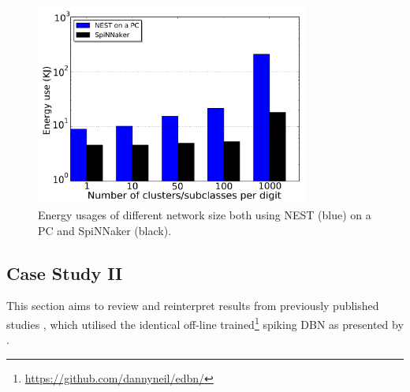 \begin{table}[h]
\begin{center}
\begin{tabular} {l| c  c c c c c}
		\end{tabular}
		\egroup
		\label{tbl:compare}
	\end{center}
\end{table}

\begin{figure}[hbt!]
	\centering
	\includegraphics[width=0.8\textwidth]{pics_bench/fig8}
	\caption{Energy usages of different network size both using NEST (blue) on a PC and SpiNNaker (black).}
	\label{fig:energy}
\end{figure}
\subsection{Case Study II}
This section aims to review and reinterpret results from previously published studies  \cite{Stromatias2015LiveDemo,Stromatias2015scalable,stromatias2015robustness}, which utilised the identical off-line trained\footnote{\url{https://github.com/dannyneil/edbn/}} spiking DBN as presented by \cite{o2013real}.


